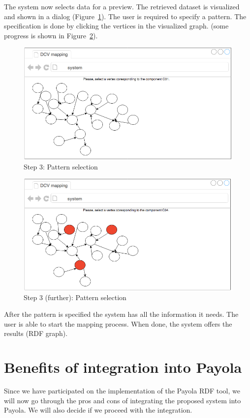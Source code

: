 The system now selects data for a preview. The retrieved dataset is 
visualized and shown in a dialog (Figure~\ref{fig:mockup-03}). The user is 
required to specify a pattern. The specification is done by clicking the vertices in 
the visualized graph. (some progress is shown in Figure~\ref{fig:mockup-05}).

\begin{figure}
	\centering
	\includegraphics[width=120mm]{img/mockup-03.png}
	\caption{Step 3: Pattern selection}
	\label{fig:mockup-03}
\end{figure}
\begin{figure}
	\centering
	\includegraphics[width=120mm]{img/mockup-05.png}
	\caption{Step 3 (further): Pattern selection}
	\label{fig:mockup-05}
\end{figure}

After the pattern is specified the system has all the information it needs. The 
user is able to start the mapping process. When done, the system offers
the results (RDF graph).
\FloatBarrier

\section{Benefits of integration into Payola}
\label{why-payola}
Since we have participated on the implementation of the Payola RDF tool, we will 
now go through the pros and cons of integrating the proposed system into Payola.
We will also decide if we proceed with the integration.

